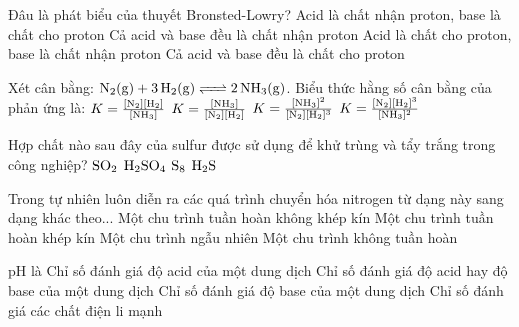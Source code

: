 \documentclass[12pt,a4paper]{article}
\begin{document}
\begin{ex}
Đâu là phát biểu của thuyết Bronsted-Lowry?
\choice
{Acid là chất nhận proton, base là chất cho proton}
{Cả acid và base đều là chất nhận proton}
{\True Acid là chất cho proton, base là chất nhận proton}
{Cả acid và base đều là chất cho proton}
\end{ex}

\begin{ex}
Xét cân bằng: $\ce{N2(g) + 3H2(g) <=> 2NH3(g)}$. Biểu thức hằng số cân bằng của phản ứng là:
\choice
{$K = \frac{[\ce{N2}][\ce{H2}]}{[\ce{NH3}]}$}
{$K = \frac{[\ce{NH3}]}{[\ce{N2}][\ce{H2}]}$}
{\True $K = \frac{[\ce{NH3}]^2}{[\ce{N2}][\ce{H2}]^3}$}
{$K = \frac{[\ce{N2}][\ce{H2}]^3}{[\ce{NH3}]^2}$}
\end{ex}

\begin{ex}
Hợp chất nào sau đây của sulfur được sử dụng để khử trùng và tẩy trắng trong công nghiệp?
\choice
{\True $\ce{SO2}$}
{$\ce{H2SO4}$}
{$\ce{S8}$}
{$\ce{H2S}$}
\end{ex}

\begin{ex}
Trong tự nhiên luôn diễn ra các quá trình chuyển hóa nitrogen từ dạng này sang dạng khác theo...
\choice
{Một chu trình tuần hoàn không khép kín}
{\True Một chu trình tuần hoàn khép kín}
{Một chu trình ngẫu nhiên}
{Một chu trình không tuần hoàn}
\end{ex}

\begin{ex}
pH là
\choice
{Chỉ số đánh giá độ acid của một dung dịch}
{\True Chỉ số đánh giá độ acid hay độ base của một dung dịch}
{Chỉ số đánh giá độ base của một dung dịch}
{Chỉ số đánh giá các chất điện li mạnh}
\end{ex}
\end{document}
